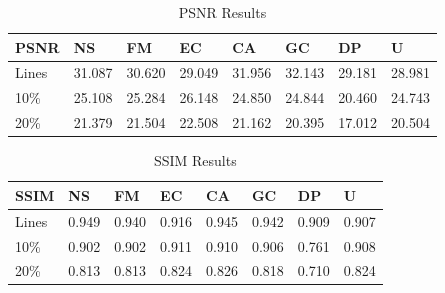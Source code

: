 \begin{table}[h!]
\centering
\begin{tabular}{@{}l|c|c|c|c|c|c|l@{}}
\textbf{PSNR} & \multicolumn{1}{l|}{NS} & \multicolumn{1}{l|}{FM} & \multicolumn{1}{l|}{EC} & \multicolumn{1}{l|}{CA} & \multicolumn{1}{l|}{GC} & \multicolumn{1}{l|}{DP} & U      \\ \midrule
Lines         & 31.087           & 30.620                       & 29.049                  & 31.956                  & 32.143                  & 29.181                     & 28.981 \\ \cmidrule(l){2-8} 
10\%          & 25.108                    & 25.284                     & 26.148                  & 24.850                  & 24.844                  & 20.460                     & 24.743 \\ \cmidrule(l){2-8} 
20\%          & 21.379                   & 21.504                     & 22.508                  & 21.162                  & 20.395                  & 17.012                  & 20.504 \\ \bottomrule
\end{tabular}
\caption{PSNR Results}
\label{tab:PSNRresults}
\end{table}

\begin{table}[h!]
\centering
\begin{tabular}{@{}l|c|c|c|c|c|c|l@{}}
\textbf{SSIM} & \multicolumn{1}{l|}{NS} & \multicolumn{1}{l|}{FM} & \multicolumn{1}{l|}{EC} & \multicolumn{1}{l|}{CA} & \multicolumn{1}{l|}{GC} & \multicolumn{1}{l|}{DP} & U     \\ \midrule
Lines         & 0.949                  & 0.940                    & 0.916                   & 0.945                   & 0.942                   & 0.909                    & 0.907 \\ \cmidrule(l){2-8} 
10\%          & 0.902                    & 0.902                & 0.911                   & 0.910                   & 0.906                   & 0.761                    & 0.908 \\ \cmidrule(l){2-8} 
20\%          & 0.813                   & 0.813                      & 0.824                   & 0.826                   & 0.818                   & 0.710                 & 0.824 \\ \bottomrule
\end{tabular}
\caption{SSIM Results}
\label{tab:SSIMresults}
\end{table}

